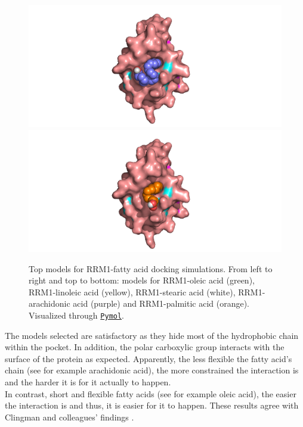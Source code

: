 \begin{figure}[htbp!]
        \includegraphics[trim={6.5cm 0 6.5cm 0},clip,width=\linewidth]{assets/RRM1_arachidonic_solo.png}
    \endminipage\hfill
        \includegraphics[trim={6.5cm 0 5.5cm 0},clip,width=\linewidth]{assets/RRM1_palmitic_solo.png}
    \endminipage
    \caption[Top models for RRM1-fatty acid docking simulations.]{Top models for RRM1-fatty acid docking simulations. From left to right and top to bottom: models for RRM1-oleic acid (green), RRM1-linoleic acid (yellow), RRM1-stearic acid (white), RRM1-arachidonic acid (purple) and RRM1-palmitic acid (orange). Visualized through \href{https://pymol.org/2/}{\texttt{Pymol}}.}
    \label{fig:fattyAcidModels}
\end{figure}

The models selected are satisfactory as they hide most of the hydrophobic chain within the pocket. In addition, the polar carboxylic group interacts with the surface of the protein as expected. Apparently, the less flexible the fatty acid's chain (see for example arachidonic acid), the more constrained the interaction is and the harder it is for it actually to happen.\\

In contrast, short and flexible fatty acids (see for example oleic acid), the easier the interaction is and thus, it is easier for it to happen. These results agree with Clingman and colleagues' findings \cite{clingman_2014}.


